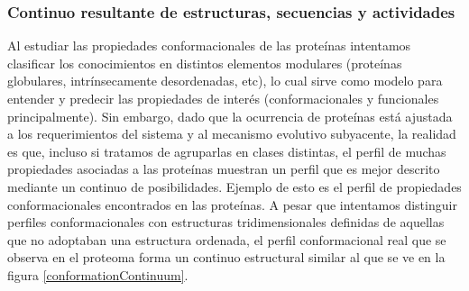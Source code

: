 
\subsubsection{Continuo resultante de estructuras, secuencias y actividades}\label{continumm}

Al estudiar las propiedades conformacionales de las proteínas intentamos clasificar los conocimientos en distintos elementos modulares (proteínas globulares, intrínsecamente desordenadas, etc), lo cual sirve como modelo para
entender y predecir las propiedades de interés (conformacionales y funcionales principalmente). 
Sin embargo, dado que la ocurrencia de proteínas está ajustada a los requerimientos del sistema y al mecanismo evolutivo subyacente, la realidad es que, 
incluso si tratamos de agruparlas en clases distintas, el perfil de muchas propiedades asociadas a las proteínas muestran un perfil que es mejor descrito mediante un continuo de posibilidades.
Ejemplo de esto es el perfil de propiedades conformacionales encontrados en las proteínas. 
A pesar que intentamos distinguir perfiles conformacionales con estructuras tridimensionales definidas de aquellas que no adoptaban una estructura ordenada, 
el perfil conformacional real que se observa en el proteoma forma un continuo estructural similar al que se ve en la figura \ref{conformationContinuum}.

% 
% 
% 

